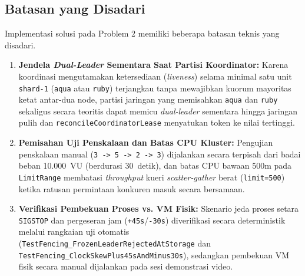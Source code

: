 \vspace{1em}

\subsection{Batasan yang Disadari}
Implementasi solusi pada Problem 2 memiliki beberapa batasan teknis yang disadari.
\begin{enumerate}
    \item \textbf{Jendela \textit{Dual-Leader} Sementara Saat Partisi Koordinator:} Karena koordinasi mengutamakan ketersediaan (\textit{liveness}) selama minimal satu unit \texttt{shard-1} (\texttt{aqua} atau \texttt{ruby}) terjangkau tanpa mewajibkan kuorum mayoritas ketat antar-dua node, partisi jaringan yang memisahkan \texttt{aqua} dan \texttt{ruby} sekaligus secara teoritis dapat memicu \textit{dual-leader} sementara hingga jaringan pulih dan \texttt{reconcileCoordinatorLease} menyatukan token ke nilai tertinggi.
    \item \textbf{Pemisahan Uji Penskalaan dan Batas CPU Kluster:} Pengujian penskalaan manual (\texttt{3 -> 5 -> 2 -> 3}) dijalankan secara terpisah dari badai beban 10.000~VU (berdurasi 30~detik), dan batas CPU bawaan 500m pada \texttt{LimitRange} membatasi \textit{throughput} kueri \textit{scatter-gather} berat (\texttt{limit=500}) ketika ratusan permintaan konkuren masuk secara bersamaan.
    \item \textbf{Verifikasi Pembekuan Proses vs. VM Fisik:} Skenario jeda proses setara \texttt{SIGSTOP} dan pergeseran jam (\texttt{+45s}/\texttt{-30s}) diverifikasi secara deterministik melalui rangkaian uji otomatis (\texttt{TestFencing\_}\allowbreak\texttt{FrozenLeaderRejectedAtStorage} dan \texttt{TestFencing\_}\allowbreak\texttt{ClockSkewPlus45sAndMinus30s}), sedangkan pembekuan VM fisik secara manual dijalankan pada sesi demonstrasi video.
\end{enumerate}

\vspace{1em}

